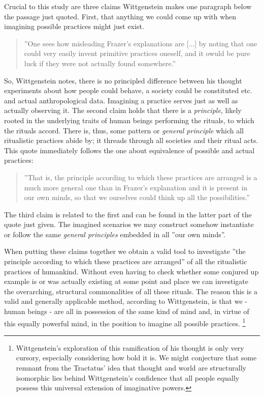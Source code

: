 \documentclass{article}
\begin{document}
Crucial to this study are three claims Wittgenstein makes one paragraph below the passage just quoted. First, that anything we could come up with when imagining possible practices might just exist.
\begin{quote}
''One sees how misleading Frazer's explanations are [...] by noting that one could very easily invent primitive practices oneself, and it owuld be pure luck if they were not actually found somewhere.''
\end{quote} %
So, Wittgenstein notes, there is no principled difference between his thought experiments about how people could behave, a society could be constituted etc. and actual anthropological data. Imagining a practice serves just as well as actually observing it.
The second claim holds that there is a \textit{principle}, likely rooted in the underlying traits of human beings performing the rituals, to which the rituals accord. There is, thus, some pattern or \textit{general principle} which all ritualistic practices abide by; it threads through all societies and their ritual acts. This quote immediately follows the one about equivalence of possible and actual practices:
\begin{quote}
''That is, the principle according to which these practices are arranged is a much more general one than in Frazer's explanation and it is present in our own minds, so that we ourselves could think up all the possibilities.''
\end{quote} %
The third claim is related to the first and can be found in the latter part of the quote just given. The imagined scenarios we may construct somehow instantiate or follow the same \textit{general principles} embedded in all ''our own minds''.

When putting these claims together we obtain a valid tool to investigate ''the principle according to which these practices are arranged'' of all the ritualistic practices of humankind. Without even having to check whether some conjured up example is or was actually existing at some point and place we can investigate the overarching, structural commonalities of all these rituals. The reason this is a valid and generally applicable method, according to Wittgenstein, is that we - human beings - are all in possession of the same kind of mind and, in virtue of this equally powerful mind, in the position to imagine all possible practices.
\footnote{Wittgenstein's exploration of this ramification of his thought is only very cursory, especially considering how bold it is. We might conjecture that some remnant from the Tractatus' idea that thought and world are structurally isomorphic lies behind Wittgenstein's confidence that all people equally possess this universal extension of imaginative powers.}
\end{document}
